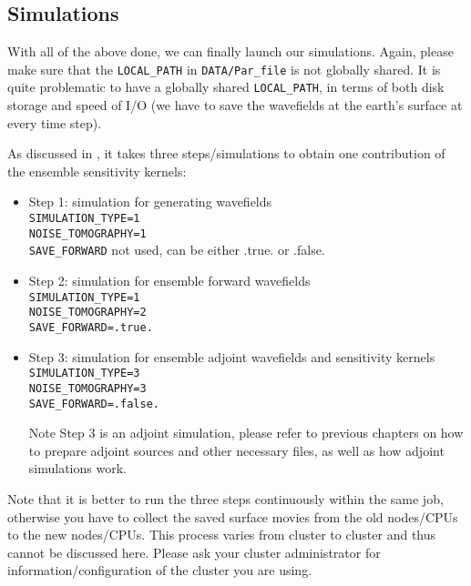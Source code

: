 \subsection{Simulations}

With all of the above done, we can finally launch our simulations.
Again, please make sure that the \texttt{LOCAL\_PATH} in \texttt{DATA/Par\_file}
is not globally shared. It is quite problematic to have a globally
shared \texttt{LOCAL\_PATH}, in terms of both disk storage and speed
of I/O (we have to save the wavefields at the earth's surface at every
time step).

As discussed in \citet{trompetal2010}, it takes three steps/simulations
to obtain one contribution of the ensemble sensitivity kernels:
\begin{itemize}
\item Step 1: simulation for generating wavefields\\
 \texttt{SIMULATION\_TYPE=1}\\
 \texttt{NOISE\_TOMOGRAPHY=1}\\
 \texttt{SAVE\_FORWARD} not used, can be either .true. or .false.
\item Step 2: simulation for ensemble forward wavefields\\
 \texttt{SIMULATION\_TYPE=1}\\
 \texttt{NOISE\_TOMOGRAPHY=2}\\
 \texttt{SAVE\_FORWARD=.true.}
\item Step 3: simulation for ensemble adjoint wavefields and sensitivity
kernels\\
 \texttt{SIMULATION\_TYPE=3}\\
 \texttt{NOISE\_TOMOGRAPHY=3}\\
 \texttt{SAVE\_FORWARD=.false.}


Note Step 3 is an adjoint simulation, please refer to previous chapters
on how to prepare adjoint sources and other necessary files, as well
as how adjoint simulations work.

\end{itemize}
Note that it is better to run the three steps continuously within
the same job, otherwise you have to collect the saved surface movies
from the old nodes/CPUs to the new nodes/CPUs. This process varies
from cluster to cluster and thus cannot be discussed here. Please
ask your cluster administrator for information/configuration of the
cluster you are using.\\



